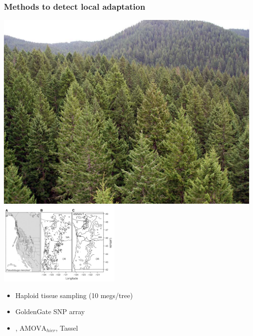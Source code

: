 \begin{frame}
\frametitle{Methods to detect local adaptation}
\begin{block}{}
\begin{centering}
\includegraphics[height=0.5\textheight]{dougfir.jpg}
\hspace{1em}
\includegraphics[width=0.45\textwidth]{eckert1.png}
\end{centering}
\begin{itemize}
\item{Haploid tissue sampling (10 megs/tree)}
\item{GoldenGate SNP array}
\item{\citet{Yu:2006ij, Storey:2003wo}, $\text{AMOVA}_{hier}$, Tassel}
\end{itemize}
\end{block}
\end{frame}

